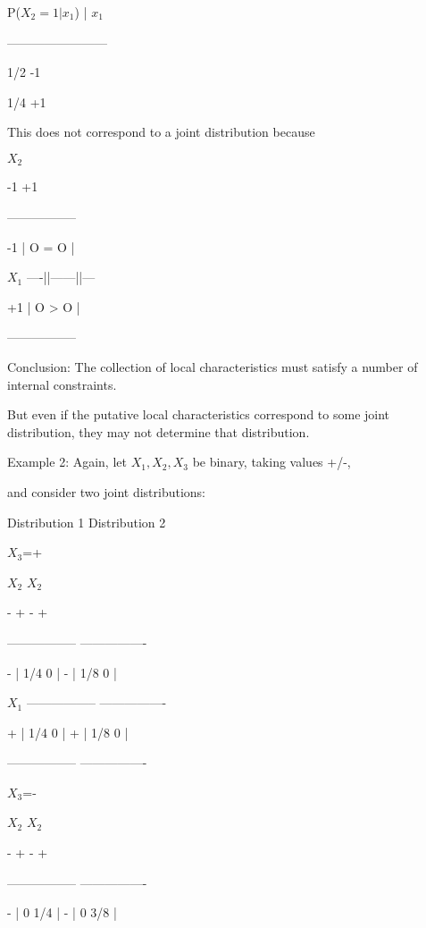 \documentclass[11pt,a4paper]{article}
\begin{document}
	P($X_2=1|x_1$)   |   $x_1$
	
	------------------------
	
	1/2               -1   
	
	1/4               +1
	
	This does not correspond to a joint distribution because
	
	$X_2$
	
	-1      +1
	
	-----------------
	
	-1  |    O  =   O   |
	
	$X_1$       ----||------||---
	
	+1  |    O  >   O   |
	
	-----------------
	
	
	
	Conclusion:  The collection of local characteristics must satisfy a number of internal constraints.  
	
	But even if the putative local characteristics correspond to some joint distribution, they may not determine that distribution.
	
	Example 2:  Again, let $X_1,X_2,X_3$ be binary, taking values +/-,
	
	and consider two joint distributions:
	
	Distribution 1                       Distribution 2
	
	$X_3$=+
	
	$X_2$                                $ X_2$
	
	-      +                            -       +
	
	-----------------                     ----------------
	
	-  |  1/4      0   |                   - |  1/8     0   |
	
$	X_1 $      -----------------                     ----------------
	
	+  |  1/4      0   |                   + |  1/8     0   |
	
	-----------------                     ----------------
	
$	X_3$=-
	
	$X_2$                                 $X_2$
	
	-      +                            -       +
	
	-----------------                     ----------------
	
	-  |   0      1/4  |                   - |   0     3/8  |
	
\end{document}
